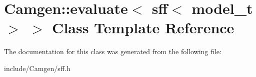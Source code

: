 \hypertarget{a00189}{\section{Camgen\-:\-:evaluate$<$ sff$<$ model\-\_\-t $>$ $>$ Class Template Reference}
\label{a00189}
}


The documentation for this class was generated from the following file\-:\begin{DoxyCompactItemize}
\item 
include/\-Camgen/sff.\-h\end{DoxyCompactItemize}
